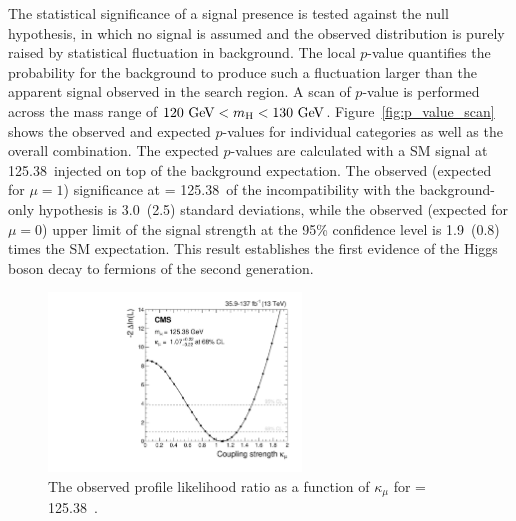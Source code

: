 The statistical significance of a signal presence is tested against the null hypothesis,
in which no signal is assumed and the observed distribution is purely raised by statistical fluctuation in background.
The local $p$-value quantifies the probability for the background to produce such a fluctuation larger than the apparent signal observed in the search region.
A scan of $p$-value is performed across the mass range of $120~\mbox{GeV}< m_{\mathrm{H}} < 130~\mbox{GeV}$.
Figure~\ref{fig:p_value_scan} shows the observed and expected $p$-values for individual categories as well as the overall combination.
The expected $p$-values are calculated with a SM signal at 125.38~\GeV injected on top of the background expectation.
The observed (expected for $\mu = 1$) significance at \mh = 125.38~\GeV of the incompatibility with the background-only hypothesis is 3.0~(2.5) standard deviations,
while the observed (expected for $\mu = 0$) upper limit of the signal strength at the 95\% confidence level is 1.9~(0.8) times the SM expectation.
This result establishes the first evidence of the Higgs boson decay to fermions of the second generation. 

\begin{figure}[!htb]
    \centering
    \captionsetup{justification=justified}
    \includegraphics[width=0.60\textwidth]{pics/results/kappa_mu.pdf}
    \caption{The observed profile likelihood ratio as a function of $\kappa_{\mu}$ for \mh = 125.38~\GeV.}
    \label{fig:kappa_scan}
\end{figure}

